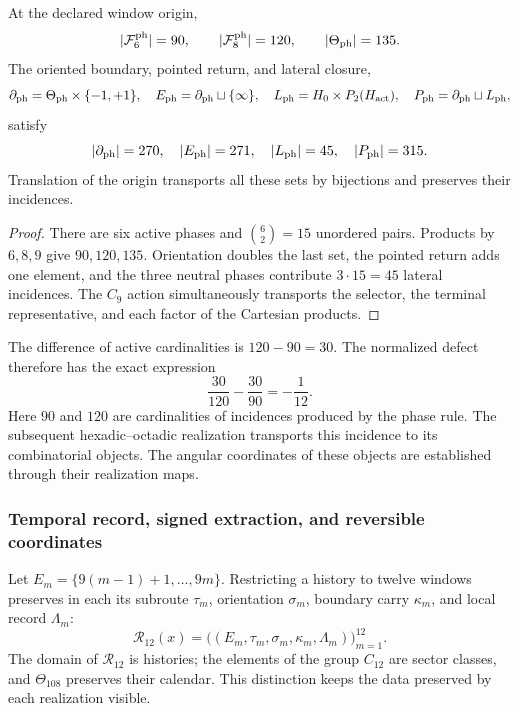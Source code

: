 \begin{theorem}
\label{ii:tpk-semicorona}
At the declared window origin,
\[
 |\mathcal F_6^{\rm ph}|=90,\qquad
 |\mathcal F_8^{\rm ph}|=120,\qquad
 |\Theta_{\rm ph}|=135.
\]
The oriented boundary, pointed return, and lateral closure,
\[
 \partial_{\rm ph}=\Theta_{\rm ph}\times\{-1,+1\},\quad
 E_{\rm ph}=\partial_{\rm ph}\sqcup\{\infty\},\quad
 L_{\rm ph}=H_0\times P_2(H_{\rm act}),\quad
 P_{\rm ph}=\partial_{\rm ph}\sqcup L_{\rm ph},
\]
satisfy
\[
 |\partial_{\rm ph}|=270,\quad |E_{\rm ph}|=271,\quad
 |L_{\rm ph}|=45,\quad |P_{\rm ph}|=315.
\]
Translation of the origin transports all these sets by bijections
and preserves their incidences.
\end{theorem}
\begin{proof}
There are six active phases and \(\binom62=15\) unordered pairs.
Products by \(6,8,9\) give \(90,120,135\). Orientation
doubles the last set, the pointed return adds one element, and the
three neutral phases contribute \(3\cdot15=45\) lateral incidences.
The \(C_9\) action simultaneously transports the selector, the
terminal representative, and each factor of the Cartesian products.
\end{proof}

The difference of active cardinalities is \(120-90=30\). The normalized
defect therefore has the exact expression
\begin{equation}
 \frac{30}{120}-\frac{30}{90}=-\frac1{12}.
 \label{ii:tpk-defecto-incidencia}
\end{equation}
Here \(90\) and \(120\) are cardinalities of incidences produced by the
phase rule. The subsequent hexadic--octadic realization transports this
incidence to its combinatorial objects. The angular coordinates of these
objects are established through their realization maps.

\subsubsection{Temporal record, signed extraction, and reversible coordinates}

Let \(E_m=\{9(m-1)+1,\ldots,9m\}\). Restricting a history
to twelve windows preserves in each its subroute \(\tau_m\),
orientation \(\sigma_m\), boundary carry \(\kappa_m\), and local
record \(\Lambda_m\):
\[
 \mathcal R_{12}(x)
 =\bigl((E_m,\tau_m,\sigma_m,\kappa_m,\Lambda_m)\bigr)_{m=1}^{12}.
\]
The domain of \(\mathcal R_{12}\) is histories; the elements of
the group \(C_{12}\) are sector classes, and
\(\Theta_{108}\) preserves their calendar. This distinction keeps
the data preserved by each realization visible.


